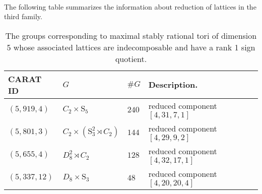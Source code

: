 \documentclass[a4paper, 14pt]{extarticle}
\theoremstyle{plain}
\theoremstyle{definition}
\newcommand{\Z}{\ensuremath{\mathbb{Z}}}
\newcommand{\exactseqs}[1]{\ensuremath{0 \longrightarrow M_{#1} \longrightarrow L_{#1} \longrightarrow \Z^{-} \longrightarrow 0}}
\begin{document}
\\
The following table summarizes the information about reduction of lattices in the third family.
 \begin{table}[H]
\centering
\begin{tabular}{lllll} 
 CARAT ID & $G$ & $\#G$ & Description.\\\hline
 $(5,919,4)$ & $C_2\times \mathrm{S}_5$ & $240$  &  reduced component $[4,31,7,1]$ \\
 $(5,801,3)$ & $C_2\times (\mathrm{S}_3^2\rtimes C_2)$ & $144$  &reduced component $[ 4, 29, 9, 2 ]$  \\
 $(5,655,4)$ & $D_8^2\rtimes C_2$ & $128$  & reduced component $[4,32,17,1]$    \\
 $(5,337,12)$ & $D_8\times \mathrm{S}_3$ & $48$  &  reduced component $[ 4, 20, 20, 4 ]$   &\\
\end{tabular}
\caption{The groups corresponding to maximal stably rational tori of dimension 5 whose associated lattices are indecomposable and have a rank 1 sign quotient.}
\label{SignPerm}
\end{table}
\end{document}
